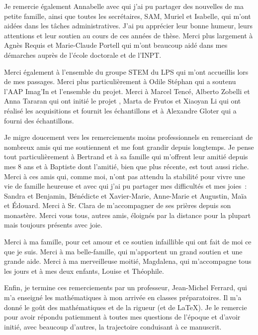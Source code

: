 \begin{fullwidth}
    Je remercie également Annabelle avec qui j'ai pu partager des nouvelles de ma petite famille, ainsi que toutes les secrétaires, SAM, Muriel et Isabelle, qui m'ont aidées dans les tâches administratives. J'ai pu apprécier leur bonne humeur, leurs attentions et leur soutien au cours de ces années de thèse. Merci plus largement à Agnès Requis et Marie-Claude Portell qui m'ont beaucoup aidé dans mes démarches auprès de l'école doctorale et de l'INPT. 
    
    Merci également à l'ensemble du groupe STEM du LPS qui m'ont accueillis lors de mes passages. Merci plus particulièrement à Odile Stéphan qui a soutenu l'AAP Imag'In et l'ensemble du projet. Merci à Marcel Tencé, Alberto Zobelli et Anna Tararan qui ont initié le projet , Marta de Frutos et Xiaoyan Li qui ont réalisé les acquisitions et fournit les échantillons et à Alexandre Gloter qui a fourni des échantillons.
    
    Je migre doucement vers les remerciements moins professionnels en remerciant de nombreux amis qui me soutiennent et me font grandir depuis longtemps. Je pense tout particulièrement à Bertrand et à sa famille qui m'offrent leur amitié depuis mes 8 ans et à Baptiste dont l'amitié, bien que plus récente, est tout aussi riche. Merci à ces amis qui, comme moi, n'ont pas attendu la stabilité pour vivre une vie de famille heureuse et avec qui j'ai pu partager mes difficultés et mes joies~: Sandra et Benjamin, Bénédicte et Xavier-Marie, Anne-Marie et Augustin, Maïa et \'Edouard. Merci à Sr. Clara de m'accompagner de ses prières depuis son monastère. Merci vous tous, autres amis, éloignés par la distance pour la plupart mais toujours présents avec joie.
    
    Merci à ma famille, pour cet amour et ce soutien infaillible qui ont fait de moi ce que je suis. Merci à ma belle-famille, qui m'apportent un grand soutien et une grande aide. Merci à ma merveilleuse moitié, Magdalena, qui m'accompagne tous les jours et à mes deux enfants, Louise et Théophile.
    
    Enfin, je termine ces remerciements par un professeur, Jean-Michel Ferrard, qui m'a enseigné les mathématiques à mon arrivée en classes préparatoires. Il m'a donné le goût des mathématiques et de la rigueur (et de \LaTeX). Je le remercie pour avoir répondu patiemment à toutes mes questions de l'époque et d'avoir initié, avec beaucoup d'autres, la trajectoire conduisant à ce manuscrit. 
    
    \newpage\thispagestyle{empty}
    
\end{fullwidth}

